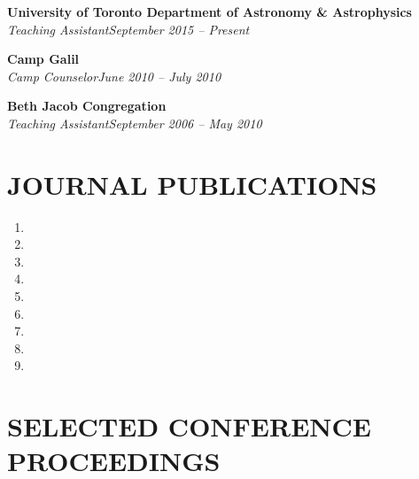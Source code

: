 \documentclass[10pt]{res} %
\begin{document}
\begin{resume}
\textbf{University of Toronto Department of Astronomy \& Astrophysics}\\
{\sl Teaching Assistant}\hfill{\sl September 2015 -- Present}%


\textbf{Camp Galil}\\
{\sl Camp Counselor}\hfill{\sl June 2010 -- July 2010}



\textbf{Beth Jacob Congregation}\\
{\sl Teaching Assistant}\hfill{\sl September 2006 -- May 2010}





 
\section{JOURNAL PUBLICATIONS}

\begin{enumerate}
\item {}
\item {}
\item {}
\item {}
\item {}
\item {}
\item {}
\item {}
\item {}
\end{enumerate}
% 


\section{SELECTED CONFERENCE PROCEEDINGS}


\end{resume}
\end{document}
